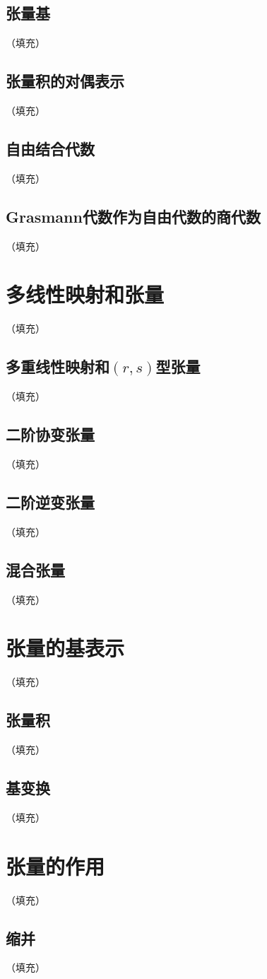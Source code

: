 \documentclass[hyperref,UTF8]{ctexbook}
\begin{document}
\subsection{张量基}（填充）
\subsection{张量积的对偶表示}（填充）
\subsection{自由结合代数}（填充）
\subsection{Grasmann代数作为自由代数的商代数}（填充）
\section{多线性映射和张量}（填充）
\subsection{多重线性映射和$(r,s)$型张量}（填充）
\subsection{二阶协变张量}（填充）
\subsection{二阶逆变张量}（填充）
\subsection{混合张量}（填充）
\section{张量的基表示}（填充）
\subsection{张量积}（填充）
\subsection{基变换}（填充）
\section{张量的作用}（填充）
\subsection{缩并}（填充）
\end{document}
